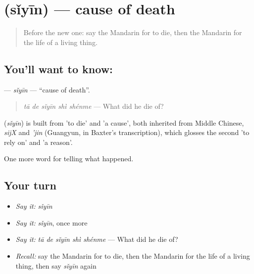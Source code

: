 \section[\texorpdfstring{\zh{死因} (sǐyīn)}{死因 (sǐyīn)}]{ (sǐyīn) — cause of death}

\label{lesson:ZH-C300-siyin}



\begin{quote}
Before the new one: say the Mandarin for to die, then the Mandarin for the life of a living thing.
\end{quote}

\subsection*{You'll want to know: }
\textbf{} — \emph{sǐyīn} — \textquotedblleft{}cause of death\textquotedblright{}.

\begin{quote}
\textbf{} \emph{tā de sǐyīn shì shénme} — What did he die of?
\end{quote}

\begin{cousinweb}
\textbf{} (\emph{sǐyīn}) is built from  'to die' and  'a cause', both inherited from Middle Chinese, \emph{sijX} and \emph{'jin} (Guangyun, in Baxter's transcription), which glosses the second 'to rely on' and 'a reason'.
\end{cousinweb}

\begin{grammarlens}[title={What you've built}]
One more word for telling what happened.
\end{grammarlens}

\subsection*{Your turn}
\begin{itemize}
\raggedright
  \item \emph{Say it:} \emph{sǐyīn}
  \item \emph{Say it:} \emph{sǐyīn}, once more
  \item \emph{Say it:} \emph{tā de sǐyīn shì shénme} — What did he die of?
  \item \emph{Recall:} say the Mandarin for to die, then the Mandarin for the life of a living thing, then say \emph{sǐyīn} again
\end{itemize}

